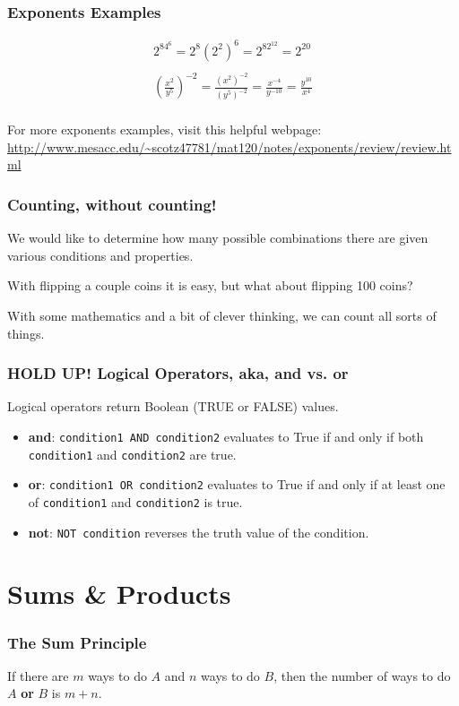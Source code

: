 \documentclass{beamer}
\newcommand{\<}{\langle}
\renewcommand{\>}{\rangle}
\begin{document}
\begin{frame}
\frametitle{Exponents Examples}

\begin{align*}
2^84^6 = 2^8(2^2)^6 = 2^82^{12} = 2^{20}\\
\\
\left(\frac{x^2}{y^5}\right)^{-2} = \frac{(x^2)^{-2}}{(y^5)^{-2}} = \frac{x^{-4}}{y^{-10}} = \frac{y^{10}}{x^4}\\
\end{align*}

For more exponents examples, visit this helpful webpage:
\url{http://www.mesacc.edu/~scotz47781/mat120/notes/exponents/review/review.html}
\end{frame}



\begin{frame}
\frametitle{Counting, without counting!}

We would like to determine how many possible combinations there are given various conditions and properties. \newline

With flipping a couple coins it is easy, but what about flipping 100 coins? \newline

With some mathematics and a bit of clever thinking, we can count all sorts of things. 
\end{frame}


\begin{frame}[fragile]
\frametitle{HOLD UP! Logical Operators, aka, and vs. or}

Logical operators return Boolean (TRUE or FALSE) values.

\begin{itemize}
\item \textbf{and}: \verb|condition1 AND condition2| evaluates to True if and only if both \verb|condition1| and \verb|condition2| are true.
\item \textbf{or}: \verb|condition1 OR condition2| evaluates to True if and only if at least one of \verb|condition1| and \verb|condition2| is true.
\item \textbf{not}: \verb|NOT condition| reverses the truth value of the condition.
\end{itemize}
\end{frame}



\section{Sums \& Products}
\begin{frame}
\frametitle{The Sum Principle}

If there are $m$ ways to do $A$ and $n$ ways to do $B$, then {\color{red}the number of ways to do $A$ \textbf{or} $B$ is $m+n$}.
\end{frame}
\end{document}
